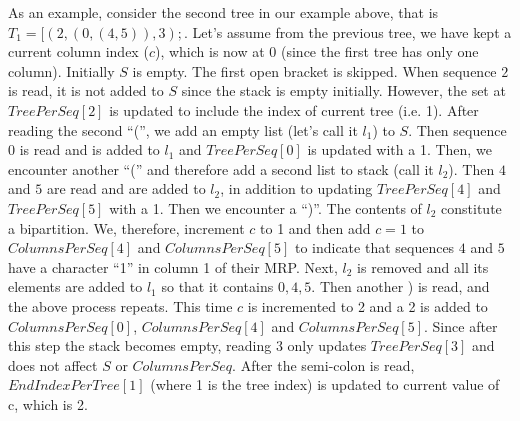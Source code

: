 \documentclass[a4paper,10pt]{article}
\begin{document}
As an example, consider the second tree in our example above, that is
$T_1=[(2,(0,(4,5)),3);$. Let's assume from the previous tree, we have kept a
current column index ($c$), which is now at 0 (since the first tree has only
one column). Initially $S$ is empty. The first open bracket is skipped.
When sequence $2$ is read, it is not added to $S$ since the stack is empty
initially. However, the set at $TreePerSeq[2]$ is updated to include the index
of current tree (i.e. 1). After reading the second ``('', we add an empty list
(let's call it $l_1$) to $S$. Then sequence $0$ is read and is added to $l_1$
and $TreePerSeq[0]$ is updated with a 1. Then, we encounter another ``('' and
therefore add a second list to stack (call it $l_2$). Then $4$ and $5$ are read
and are added to $l_2$, in addition to updating $TreePerSeq[4]$
and $TreePerSeq[5]$ with a 1. Then we encounter a ``)''. The contents of $l_2$
constitute a bipartition. We, therefore, increment $c$ to 1 and then add $c=1$
to $ColumnsPerSeq[4]$ and $ColumnsPerSeq[5]$ to indicate that sequences $4$ and
$5$ have a character ``1'' in column 1 of their MRP. Next, $l_2$ is removed and
all its elements are added to $l_1$ so that it contains $0,4,5$. Then another )
is read, and the above process repeats. This time $c$ is incremented to 2 and a
2 is added to $ColumnsPerSeq[0]$, $ColumnsPerSeq[4]$ and
$ColumnsPerSeq[5]$. Since after this step the stack becomes empty, reading $3$
only updates $TreePerSeq[3]$ and does not affect $S$ or $ColumnsPerSeq$. After
the semi-colon is read, $EndIndexPerTree[1]$ (where 1 is the tree index) is
updated to current value of c, which is 2. 
\end{document}
